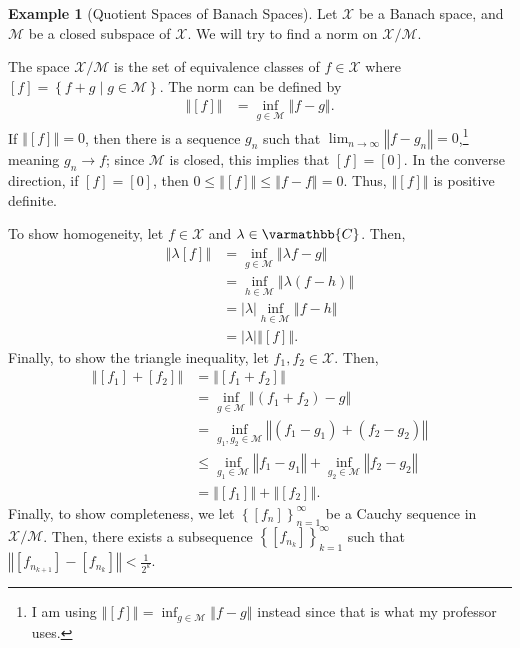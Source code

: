 \documentclass[10pt]{extarticle}
\newcommand{\C}{\mathbb{C}}
\newcommand{\norm}[1]{\left\Vert #1\right\Vert}
\newcommand{\set}[1]{\left\{#1\right\}}
\theoremstyle{plain}
\theoremstyle{definition}
\newtheorem*{example}{Example}
\theoremstyle{note}
\renewcommand*{\mathbb}[1]{\varmathbb{#1}}
\renewcommand{\newline}{\hfill\break}
\begin{document}
\begin{example}[Quotient Spaces of Banach Spaces]
  Let $\mathcal{X}$ be a Banach space, and $\mathcal{M}$ be a closed subspace of $\mathcal{X}$. We will try to find a norm on $\mathcal{X}/\mathcal{M}$.\newline

  The space $\mathcal{X}/\mathcal{M}$ is the set of equivalence classes of $f\in \mathcal{X}$ where $[f] = \set{f + g\mid g\in \mathcal{M}}$. The norm can be defined by
  \begin{align*}
    \norm{[f]} &= \inf_{g\in \mathcal{M}}\norm{f-g}.
  \end{align*}
  If $\norm{[f]} = 0$, then there is a sequence $g_n$ such that $\lim_{n\rightarrow\infty}\norm{f - g_n} = 0$,\footnote{I am using $\norm{[f]} = \inf_{g\in \mathcal{M}}\norm{f-g}$ instead since that is what my professor uses.} meaning $g_n \rightarrow f$; since $\mathcal{M}$ is closed, this implies that $[f] = [0]$. In the converse direction, if $[f] = [0]$, then $0\leq \norm{[f]} \leq \norm{f-f} = 0$. Thus, $\norm{[f]}$ is positive definite.\newline

  To show homogeneity, let $f\in \mathcal{X}$ and $\lambda \in \C$. Then,
  \begin{align*}
    \norm{\lambda[f]} &= \inf_{g\in \mathcal{M}}\norm{\lambda f - g}\\
                      &= \inf_{h\in \mathcal{M}}\norm{\lambda\left(f - h\right)}\\
                      &= |\lambda|\inf_{h\in \mathcal{M}}\norm{f - h}\\
                      &= |\lambda|\norm{[f]}.
  \end{align*}
  Finally, to show the triangle inequality, let $f_1,f_2\in \mathcal{X}$. Then,
  \begin{align*}
    \norm{[f_1] + [f_2]} &= \norm{[f_1 + f_2]}\\
                         &= \inf_{g\in \mathcal{M}}\norm{\left(f_1 + f_2\right) - g}\\
                         &= \inf_{g_1,g_2\in \mathcal{M}}\norm{(f_1 - g_1) + (f_2 - g_2)}\\
                         &\leq \inf_{g_1\in \mathcal{M}}\norm{f_1 - g_1} + \inf_{g_2\in \mathcal{M}}\norm{f_2 - g_2}\\
                         &= \norm{[f_1]} + \norm{[f_2]}.
  \end{align*}
  Finally, to show completeness, we let $\set{[f_n]}_{n=1}^{\infty}$ be a Cauchy sequence in $\mathcal{X}/\mathcal{M}$. Then, there exists a subsequence $\set{\left[f_{n_k}\right]}_{k=1}^{\infty}$ such that $\norm{\left[f_{n_{k+1}}\right] - \left[f_{n_k}\right]} < \frac{1}{2^k}$.\newline


\end{example}
\end{document}
